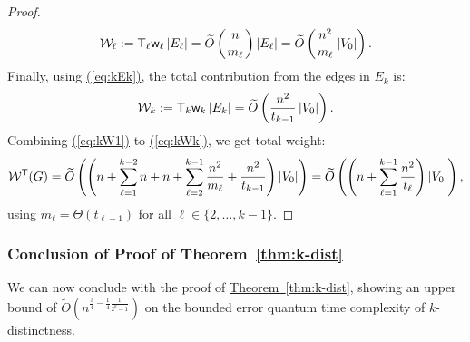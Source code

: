 \documentclass{theoretics}
\newcommand{\eq}[1]{\hyperref[eq:#1]{(\ref*{eq:#1})}}
\newcommand{\thm}[1]{\hyperref[thm:#1]{Theorem~\ref*{thm:#1}}}
\renewcommand{\>}{\rangle}
\newcommand{\<}{\langle}
\renewcommand{\(}{\left(}
\renewcommand{\)}{\right)}
\def\abs#1{\left| #1 \right|}
\def\w{{\sf w}}
\begin{document}
\begin{proof}
\begin{equation}
		{\cal W}_{\ell}:= {\sf T}_{\ell}\w_{\ell}\abs{E_{\ell}} =\widetilde{O}\left( \frac{n}{m_{\ell}} \right)|E_{\ell}|
		=\widetilde{O}\left(\frac{n^2}{m_{\ell}}\abs{V_0}\right).\label{eq:kWk1}
	\end{equation}
Finally, using \eq{kEk}, the total contribution from the edges in $E_k$ is:
	\begin{equation}
		{\cal W}_k := {\sf T}_k\w_k\abs{E_k}=\widetilde{O}\left(\frac{n^2}{t_{k-1}}\abs{V_0}\right).\label{eq:kWk}
	\end{equation}
	Combining \eq{kW1} to \eq{kWk}, we get total weight:
\begin{align*}
{\cal W}^{\sf T}(G) = \widetilde{O}\left(\left(n +\sum_{\ell=1}^{k-2}n+ n + \sum_{\ell=2}^{k-1} \frac{n^2}{m_{\ell}} + \frac{n^2}{t_{k-1}}\right)\abs{V_0}\right)
= \widetilde{O}\left(\left(n  + \sum_{\ell=1}^{k-1} \frac{n^2}{t_{\ell}}\right)\abs{V_0}\right),
\end{align*}
using $m_{\ell}=\Theta(t_{\ell-1})$ for all $\ell\in \{2,\dots,k-1\}$. 
\end{proof}


\subsubsection{Conclusion of Proof of Theorem~\ref{thm:k-dist}}\label{sec:conclusion}

We can now conclude with the proof of \thm{k-dist}, showing an upper bound of $\widetilde{O}\left(n^{\frac{3}{4}-\frac{1}{4}\frac{1}{2^k-1}}\right)$ on the bounded error quantum time complexity of $k$-distinctness. 
\end{document}
